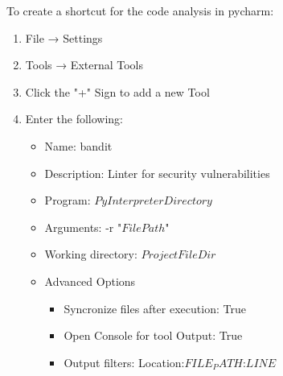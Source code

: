 To create a shortcut for the code analysis in pycharm:

\begin{enumerate}
    \item File → Settings
    \item Tools → External Tools
    \item Click the "+" Sign to add a new Tool
    \item Enter the following:
    \begin{itemize}
        \item Name: bandit
        \item Description: Linter for security vulnerabilities
        \item Program: $PyInterpreterDirectory$\bandit
        \item Arguments: -r "$FilePath$"
        \item Working directory: $ProjectFileDir$
        \item Advanced Options
        \begin{itemize}
            \item Syncronize files after execution: True
            \item Open Console for tool Output: True
            \item Output filters: \s*Location:\s*$FILE_PATH$:\s*$LINE$
        \end{itemize}
    \end{itemize}
\end{enumerate}

